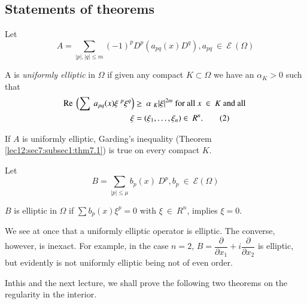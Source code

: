 \subsection{Statements of theorems}\label{lec13:sec8:subsec2} %

Let
\begin{equation}
  A = \sum_{|p|,|q|\le m} (-1)^p D^p(a_{pq}(x)D^q),
  a_{pq} ~ \in ~ \mathscr{E} ~ (\Omega) \tag{1}\label{lec13:sec8:subsec2:eq1} 
\end{equation}

\begin{definition}\label{lec13:sec8:subsec2:def8.3}%
  A is {\em{uniformly elliptic}} in $\Omega$ if given any compact $K
  \subset \Omega$ we have an $\alpha_{K}> 0$ such that 
  \begin{align*}
    \operatorname{Re}  ~ \left(\sum ~ a_{pq}(x) \xi ~ ^{p}\xi^q\right) & \ge ~ \alpha ~
    _{K}|\xi|^{2m} \text{ for all } x ~ \in ~ K \text{ and all }\\
    \xi & = (\xi_1, \ldots, \xi_n ) \in ~ R^n.\tag{2}\label{lec13:sec8:subsec2:eq2} 
  \end{align*}
\end{definition}

\begin{remark*}%
  If $A$ is uniformly elliptic, Garding's inequality (Theorem \ref{lec12:sec7:subsec1:thm7.1}) is
  true on every compact $K$.  
\end{remark*}

Let 
\begin{equation}
  B = \sum_{|p|\le \mu} b_p(x) ~ D^p, b_p ~ \in ~
  \mathscr{E}(\Omega) \tag{3}\label{lec13:sec8:subsec2:eq3} 
\end{equation}

\begin{definition}\label{lec13:sec8:subsec2:def8.4}%
  $B$ is elliptic in $\Omega$ if $\sum b_p(x) \xi^p = 0$ with $\xi ~
  \in ~ R^n$, implies $\xi = 0$. 
\end{definition}

We see at once that a uniformly elliptic operator is elliptic. The
converse, however, is inexact. For example, in the case $n =2$, $B =
\dfrac{\partial}{\partial x_1} + i \dfrac{\partial}{\partial x_2}$ is
elliptic, but evidently is not uniformly elliptic being not of even
order. 

In\pageoriginale this and the next lecture, we shall prove the following two
theorems on the regularity in the interior. 

